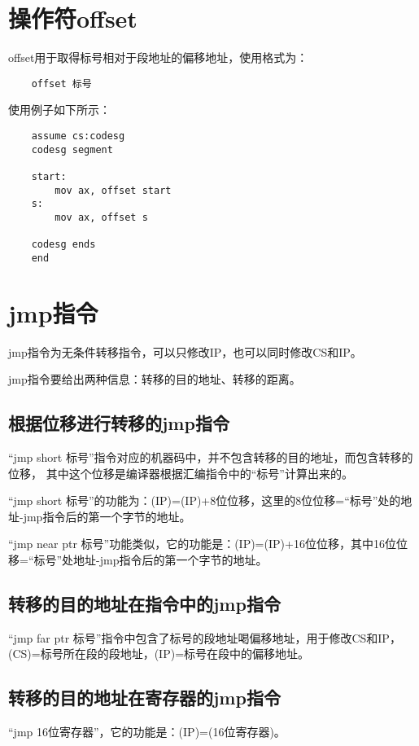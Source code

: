 \documentclass[a4paper,left=2.5cm,right=2.5cm,11pt]{article}
\begin{document}
\tableofcontents

\clearpage

\section{操作符offset}
	offset用于取得标号相对于段地址的偏移地址，使用格式为：
	\begin{lstlisting}
	offset 标号
	\end{lstlisting}

	使用例子如下所示：
	\begin{lstlisting}
	assume cs:codesg
	codesg segment
	
	start:
		mov ax, offset start
	s:
		mov ax, offset s

	codesg ends
	end
	\end{lstlisting}

\section{jmp指令}
	jmp指令为无条件转移指令，可以只修改IP，也可以同时修改CS和IP。\par
	jmp指令要给出两种信息：转移的目的地址、转移的距离。

\subsection{根据位移进行转移的jmp指令}
	“jmp short 标号”指令对应的机器码中，并不包含转移的目的地址，而包含转移的位移，
	其中这个位移是编译器根据汇编指令中的“标号”计算出来的。\par

	“jmp short 标号”的功能为：(IP)=(IP)+8位位移，这里的8位位移=“标号”处的地址-jmp指令后的第一个字节的地址。\par

	“jmp near ptr 标号”功能类似，它的功能是：(IP)=(IP)+16位位移，其中16位位移=“标号”处地址-jmp指令后的第一个字节的地址。

\subsection{转移的目的地址在指令中的jmp指令}
	“jmp far ptr 标号”指令中包含了标号的段地址喝偏移地址，用于修改CS和IP，(CS)=标号所在段的段地址，(IP)=标号在段中的偏移地址。

\subsection{转移的目的地址在寄存器的jmp指令}
	“jmp 16位寄存器”，它的功能是：(IP)=(16位寄存器)。
\end{document}

